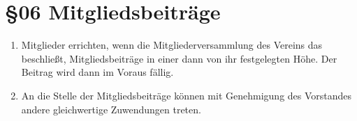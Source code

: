 \section*{§06 Mitgliedsbeiträge}
\begin{enumerate}
\item Mitglieder errichten, wenn die Mitgliederversammlung des Vereins das
beschließt, Mitgliedsbeiträge in einer dann von ihr festgelegten Höhe.
Der Beitrag wird dann im Voraus fällig.
\item An die Stelle der Mitgliedsbeiträge können mit Genehmigung des Vorstandes
andere gleichwertige Zuwendungen treten.
\end{enumerate}

